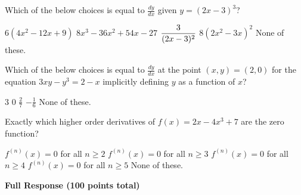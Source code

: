 \documentclass[12pt]{exam}
\newcommand{\ds}{\ensuremath{\displaystyle}}
\newcommand{\<}{\langle}
\renewcommand{\>}{\rangle}
\begin{document}
\begin{questions}
\vfill
\newpage

\question[20]
Which of the below choices is equal to \(\frac{dy}{dx}\) given \(y=(2x-3)^3\)?

\begin{checkboxes}
  \choice \(6(4x^2-12x+9)\)
  \choice \(8x^3-36x^2+54x-27\)
  \choice \(\ds\frac{3}{(2x-3)^2}\)
  \choice \(8(2x^2-3x)^2\)
  \choice None of these.
\end{checkboxes}

\vfill

\question[20]
Which of the below choices is equal to \(\frac{dy}{dx}\) at the point
\((x,y)=(2,0)\) for the equation \(3xy-y^3=2-x\) implicitly defining \(y\)
as a function of \(x\)?

\begin{checkboxes}
  \choice \(3\)
  \choice \(0\)
  \choice \(\frac{2}{7}\)
  \choice \(-\frac{1}{6}\)
  \choice None of these.
\end{checkboxes}

\vfill

\question[20]
Exactly which higher order derivatives of \(f(x)=2x-4x^3+7\) are the zero function?

\begin{checkboxes}
  \choice \(f^{(n)}(x)=0\) for all \(n\geq 2\)
  \choice \(f^{(n)}(x)=0\) for all \(n\geq 3\)
  \choice \(f^{(n)}(x)=0\) for all \(n\geq 4\)
  \choice \(f^{(n)}(x)=0\) for all \(n\geq 5\)
  \choice None of these.
\end{checkboxes}

\vfill


\end{questions}




\newpage



\begin{center}
  \textbf{Full Response (100 points total)}
\end{center}
\end{document}
